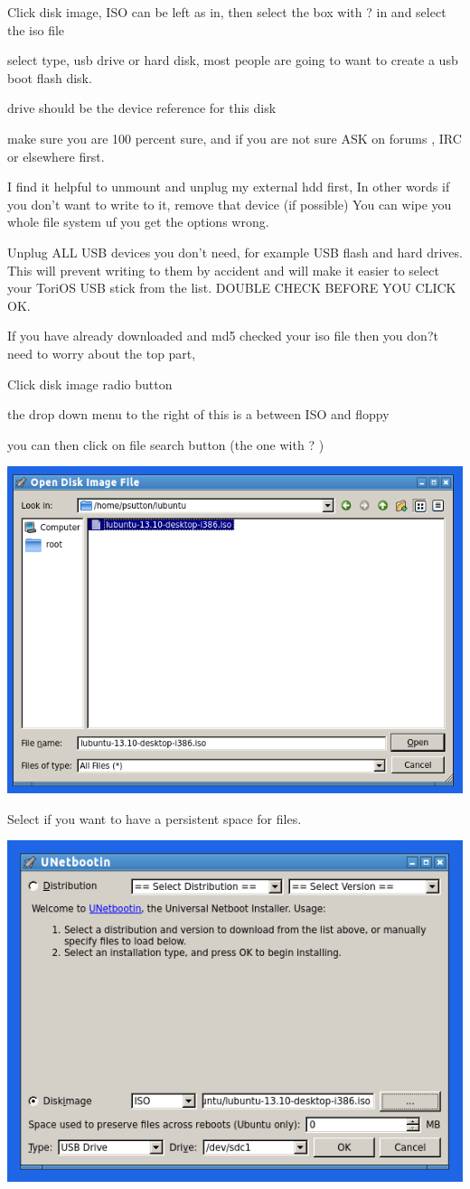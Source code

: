 \documentclass[12pt,a4paper]{book}
\begin{document}
Click disk image,  ISO can be left as in,  then select the box with ? in and select the iso file

select type, usb drive or hard disk,  most people are going to want to create a usb boot flash disk.

drive should be the device reference for this disk

make sure you are 100 percent sure,  and if you are not sure ASK on forums , IRC or elsewhere first.

I find it helpful to unmount and unplug my external hdd first,  In other words if you don't want to write to it,  remove that device (if possible)  You can wipe you whole file system uf you get the options wrong. 

Unplug ALL USB devices you don't need, for example USB flash and hard drives. This will prevent writing to them by accident and will make it easier to select your ToriOS  USB stick from the list.  DOUBLE CHECK BEFORE YOU CLICK OK. 

If you have already downloaded and md5 checked your iso file then you don?t need to worry about the top part,

Click disk image radio button

the drop down menu to the right of this is a between ISO and floppy

you can then click on file search button (the one with ? )
\begin{center}
\includegraphics[width=0.7\linewidth]{unetbootin2} 

\end{center}



Select if you want to have a persistent space for files.


\begin{center}
\includegraphics[width=0.7\linewidth]{unetbootin3}
\end{center}
\end{document}
